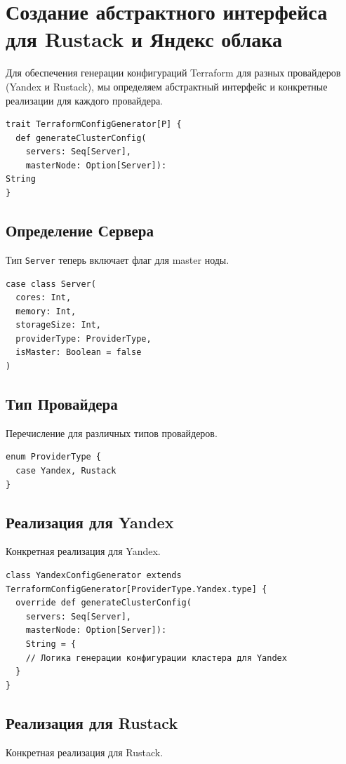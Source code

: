 \section{Создание абстрактного интерфейса для Rustack и Яндекс облака}
Для обеспечения генерации конфигураций Terraform для разных провайдеров (Yandex
и Rustack), мы определяем абстрактный интерфейс и конкретные реализации для
каждого провайдера.

\begin{verbatim}
trait TerraformConfigGenerator[P] {
  def generateClusterConfig(
    servers: Seq[Server],
    masterNode: Option[Server]):
String
}
\end{verbatim}

\subsection{Определение Сервера}
Тип \texttt{Server} теперь включает флаг для master ноды.

\begin{verbatim}
case class Server(
  cores: Int,
  memory: Int,
  storageSize: Int,
  providerType: ProviderType,
  isMaster: Boolean = false
)
\end{verbatim}

\subsection{Тип Провайдера}
Перечисление для различных типов провайдеров.

\begin{verbatim}
enum ProviderType {
  case Yandex, Rustack
}
\end{verbatim}

\subsection{Реализация для Yandex}
Конкретная реализация для Yandex.

\begin{verbatim}
class YandexConfigGenerator extends
TerraformConfigGenerator[ProviderType.Yandex.type] {
  override def generateClusterConfig(
    servers: Seq[Server], 
    masterNode: Option[Server]):
    String = {
    // Логика генерации конфигурации кластера для Yandex
  }
}
\end{verbatim}

\subsection{Реализация для Rustack}
Конкретная реализация для Rustack.


